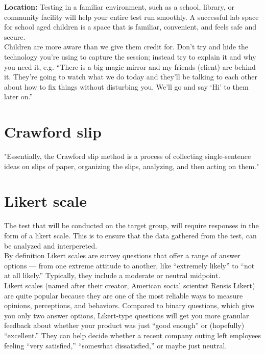 \textbf{Location:} Testing in a familiar environment, such as a school, library, or community facility will help your entire test run smoothly. A successful lab space for school aged children is a space that is familiar, convenient, and feels safe and secure.\cite{testwithkids} \\

Children are more aware than we give them credit for. Don’t try and hide the technology you’re using to capture the session; instead try to explain it and why you need it, e.g.
“There is a big magic mirror and my friends (client) are behind it. They’re going to watch what we do today and they’ll be talking to each other about how to fix things without disturbing you. We’ll go and say ‘Hi’ to them later on.”\cite{testwithkids}\\

\section{Crawford slip}\label{sec:crawfordSlip}
"Essentially, the Crawford slip method is a process
of collecting single-sentence ideas on slips of paper, organizing the slips, analyzing, and then acting on them." \cite{crawfordSlip}

\section{Likert scale}

The test that will be conducted on the target group, will require responses in the form of a likert scale. This is to ensure that the data gathered from the test, can be analyzed and interpereted. \cite{likertScale} \\

By definition Likert scales are survey questions that offer a range of answer options — from one extreme attitude to another, like “extremely likely” to “not at all likely.” Typically, they include a moderate or neutral midpoint.\cite{likertScale} \\

Likert scales (named after their creator, American social scientist Rensis Likert) are quite popular because they are one of the most reliable ways to measure opinions, perceptions, and behaviors.
Compared to binary questions, which give you only two answer options, Likert-type questions will get you more granular feedback about whether your product was just “good enough” or (hopefully) “excellent.” They can help decide whether a recent company outing left employees feeling “very satisfied,” “somewhat dissatisfied,” or maybe just neutral.\cite{likertScale} \\

